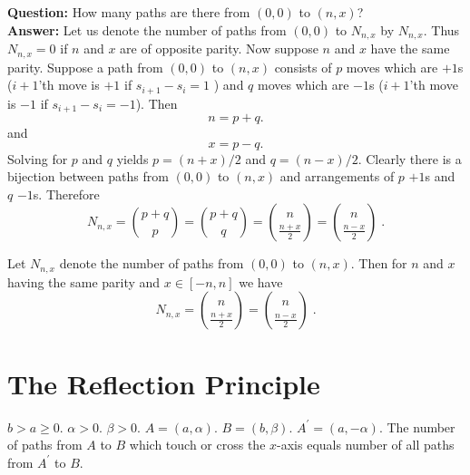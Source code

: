 \noindent \textbf{Question:} How many paths are there from $(0,0)$ to $(n,x)$?\\
\noindent\textbf{Answer:} Let us denote the number of paths from $(0,0)$ to $N_{n,x}$ by $N_{n,x}$. Thus $N_{n,x}=0$ if $n$ 
and $x$ are of opposite parity. Now suppose $n$ and $x$ have the same parity. Suppose a path from $(0,0)$ to $(n,x)$ consists of $p$ moves which are $+1$s ($i+1$'th move is $+1$ if $s_{i+1}-s_i=1$ ) and $q$ moves which are $-1$s ($i+1$'th move is $-1$ if $s_{i+1}-s_i=-1$). Then 
\begin{equation}
n = p+q.
\end{equation}
and
\begin{equation}
x = p-q.
\end{equation}
Solving for $p$ and $q$ yields $p=(n+x)/2$ and $q=(n-x)/2$. Clearly there is a bijection between paths from $(0,0)$ to $(n,x)$ and arrangements of $p$ $+1$s and $q$ $-1$s. Therefore
\begin{equation}
N_{n,x} 
= \binom{p+q}{p} 
= \binom{p+q}{q} 
= \binom{n}{\frac{n+x}{2}}
= \binom{n}{\frac{n-x}{2}}\;.
\end{equation}

\begin{proposition}
Let $N_{n,x}$ denote the number of paths from $(0,0)$ to $(n,x)$. Then for $n$ and $x$ having the same parity and $x\in[-n,n]$ we have
\begin{equation}
N_{n,x} 
= \binom{n}{\frac{n+x}{2}}
= \binom{n}{\frac{n-x}{2}}\;.
\end{equation}
\end{proposition}

\newpage


\section{The Reflection Principle}

\begin{theorem}
$b>a\geq 0$. $\alpha>0$. $\beta>0$. $A=(a,\alpha)$. $B=(b,\beta)$. $A^\prime=(a,-\alpha)$. The number of paths from $A$ to $B$ which touch or cross the $x$-axis equals number of all paths from $A^\prime$ to $B$.
\end{theorem}

